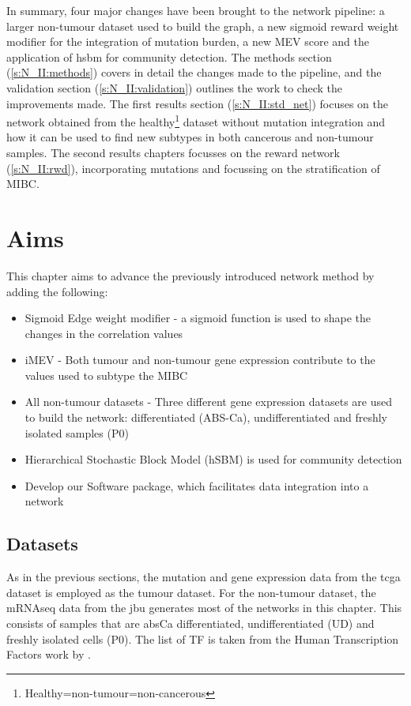 In summary, four major changes have been brought to the network pipeline: a larger non-tumour dataset used to build the graph, a new sigmoid reward weight modifier for the integration of mutation burden, a new MEV score and the application of \acrfull{hsbm} for community detection. The methods section (\ref{s:N_II:methods}) covers in detail the changes made to the pipeline, and the validation section (\ref{s:N_II:validation}) outlines the work to check the improvements made. The first results section (\cref{s:N_II:std_net}) focuses on the network obtained from the healthy\footnote{Healthy=non-tumour=non-cancerous} dataset without mutation integration and how it can be used to find new subtypes in both cancerous and non-tumour samples. The second results chapters focusses on the reward network (\ref{s:N_II:rwd}), incorporating mutations and focussing on the stratification of MIBC.


\section{Aims}

This chapter aims to advance the previously introduced network method by adding the following:
\begin{itemize}
    \item Sigmoid Edge weight modifier - a sigmoid function is used to shape the changes in the correlation values
    \item iMEV - Both tumour and non-tumour gene expression contribute to the values used to subtype the MIBC
    \item All non-tumour datasets - Three different gene expression datasets are used to build the network: differentiated (ABS-Ca), undifferentiated and freshly isolated samples (P0)
    \item Hierarchical Stochastic Block Model (hSBM) is used for community detection
    \item Develop our Software package, which facilitates data integration into a network
\end{itemize}

\subsection*{Datasets}

As in the previous sections, the mutation and gene expression data from the \acrshort{tcga} dataset is employed as the tumour dataset. For the non-tumour dataset, the mRNAseq data from the \acrfull{jbu} generates most of the networks in this chapter. This consists of samples that are \acrfull{absCa} differentiated, undifferentiated (UD) and freshly isolated cells (P0). The list of TF is taken from the Human Transcription Factors work by \citet{Lambert2018-el}.

